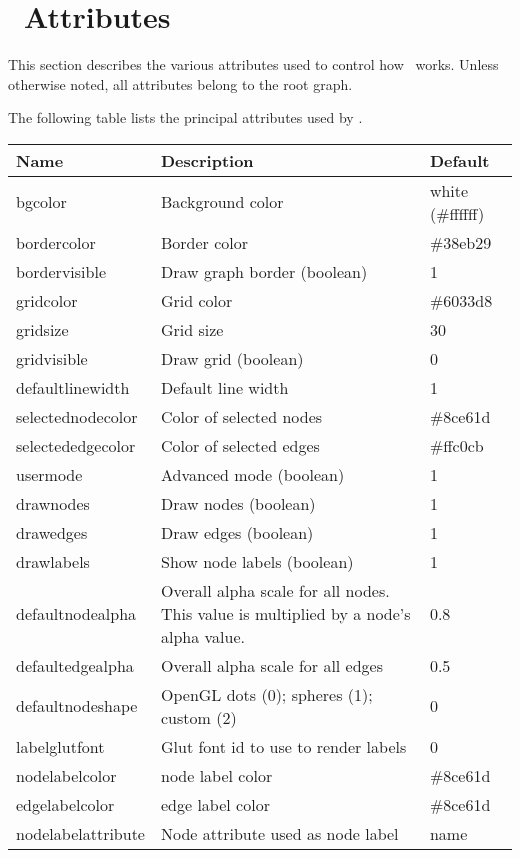 \section{\smyrna\ Attributes}
\label{sec:attribs}

This section describes the various attributes used to control
how \smyrna\ works. Unless otherwise noted, 
all attributes belong to the root graph.

 The following table lists the principal
attributes used by \smyrna.\\
\begin{center}
{\footnotesize
\begin{tabular}[t]{|l|p{2.5in}|l|} \hline
{\bf Name} & {\bf Description} & {\bf Default} \\ \hline
bgcolor & Background color & white (\#ffffff) \\
bordercolor & Border color & \#38eb29 \\
bordervisible & Draw graph border (boolean) & 1 \\ 
gridcolor & Grid color & \#6033d8 \\ 
gridsize & Grid size & 30 \\ 
gridvisible & Draw grid (boolean) & 0 \\
defaultlinewidth & Default line width  & 1 \\ 
selectednodecolor & Color of selected nodes & \#8ce61d \\ 
selectededgecolor & Color of selected edges & \#ffc0cb \\
usermode & Advanced mode (boolean) & 1 \\
drawnodes & Draw nodes (boolean) & 1 \\
drawedges & Draw edges (boolean) & 1 \\
drawlabels & Show node labels (boolean) & 1 \\
defaultnodealpha & Overall alpha scale for all nodes. This 
value is multiplied by a node's alpha value. & 0.8 \\
defaultedgealpha & Overall alpha scale for all edges & 0.5 \\
defaultnodeshape & OpenGL dots (0); spheres (1); custom (2) & 0 \\ 
labelglutfont & Glut font id to use to render labels & 0 \\
nodelabelcolor & node label color & \#8ce61d \\
edgelabelcolor & edge label color & \#8ce61d \\
nodelabelattribute & Node attribute used as node label & name \\

\end{tabular}}
\end{center}
